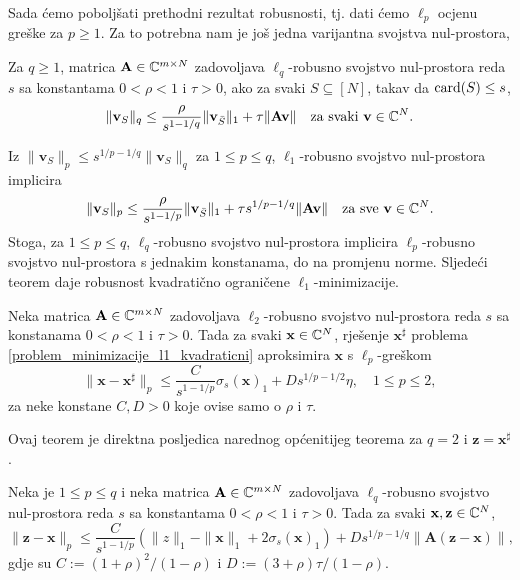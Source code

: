 \documentclass[a4paper,twoside,12pt]{memoir} %
\newcommand{\vect}[1]{\mathbf{#1}}
\renewcommand{\vec}{\vect}
\newcommand{\card}{\text{\normalfont{card}}}
\newcommand{\norm}[1]{\|{#1}\|}
\begin{document}
Sada \'cemo pobolj\v{s}ati prethodni rezultat robusnosti, tj. dati \'cemo $\ell_p$ ocjenu gre\v{s}ke za $p \geq 1$. Za to potrebna nam je jo\v{s} jedna varijantna svojstva nul-prostora,
\begin{defn}
    Za $q \geq 1$, matrica $\vec A \in \C^{m \times N}$ zadovoljava $\ell_q$-robusno svojstvo nul-prostora reda $s$ sa konstantama $0 < \rho < 1$ i $\tau > 0$, ako za svaki $S \subseteq [N]$, takav da $\card(S) \leq s$,
    \begin{equation*}
        \norm{\vec v_S}_q \leq \frac{\rho}{s^{1-1/q}}\norm{\vec v_{\bar S}}_1 + \tau \norm{\vec{Av}}\quad \text{za svaki }\vec{v} \in \C^N.
    \end{equation*}
\end{defn}
\noindent Iz $\norm{\vec v_S}_p \leq s^{1/p - 1/q}\norm{\vec v_S}_q$ za $1 \leq p \leq q$, $\ell_1$-robusno svojstvo nul-prostora implicira
\begin{equation*}
    \norm{\vec v_S}_p \leq \frac{\rho}{s^{1-1/p}}\norm{\vec v_{\bar S}}_1 + \tau s^{1/p-1/q}\norm{\vec{Av}} \quad \text{za sve } \vec v \in \C^N.
\end{equation*}
Stoga, za $1 \leq p \leq q$, $\ell_q$-robusno svojstvo nul-prostora implicira $\ell_p$-robusno svojstvo nul-prostora s jednakim konstanama, do na promjenu norme. Sljede\'ci teorem daje robusnost kvadrati\v{c}no ograni\v{c}ene $\ell_1$-minimizacije.
\begin{thm}\label{robusnost_l1_min_kvad_ogr}
    Neka matrica $\vec A \in \C^{m \times N}$  zadovoljava $\ell_2$-robusno svojstvo nul-prostora reda $s$ sa konstanama $0<\rho<1$ i $\tau >0$. Tada za svaki $\vec x \in \C^N$, rje\v{s}enje $\vec x^{\sharp}$ problema \eqref{problem_minimizacije_l1_kvadraticni} aproksimira $\vec x$ s $\ell_p$-gre\v{s}kom
    \begin{equation}
        \norm{\vec x - \vec x^{\sharp}}_p \leq \frac{C}{s^{1-1/p}} \sigma_s(\vec x)_1 + D s^{1/p - 1/2} \eta, \quad 1 \leq p \leq 2,
    \end{equation}
    za neke konstane $C,D > 0$ koje ovise samo o $\rho$ i $\tau$.
\end{thm}
Ovaj teorem je direktna posljedica narednog op\'cenitijeg teorema za $q = 2$ i $\vec z = \vec x^{\sharp}$.
\begin{thm}
    Neka je $1 \leq p \leq q$ i neka matrica $\vec A \in \C^{m \times N}$ zadovoljava $\ell_q$-robusno svojstvo nul-prostora reda $s$ sa konstantama $0 < \rho < 1$ i $\tau > 0$. Tada za svaki $\vec x, \vec z \in \C^N$,
    \begin{equation*}
        \norm{\vec z - \vec x}_p \leq \frac{C}{s^{1-1/p}}(\norm{z}_1 - \norm{\vec x}_1 + 2 \sigma_s(\vec x)_1) + D s^{1/p-1/q} \norm{\vec A (\vec z - \vec x)},
    \end{equation*}
    gdje su $C:=(1+\rho)^2/(1-\rho)$ i $D:=(3+\rho)\tau/(1-\rho)$.
\end{thm}
\end{document}
